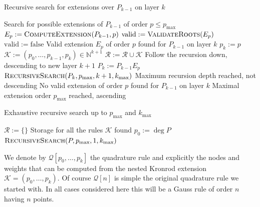 \documentclass[a4paper,10pt]{article}
\begin{document}
\begin{algorithm}
  \caption{Recursive search for extensions over $P_{k-1}$ on layer $k$}
  \label{alg:recursive_search}
  \begin{algorithmic}
    \State {}
    \Comment Search for possible extensions of $P_{k-1}$ of order $p \leq p_{\textrm{max}}$
      \State $E_p := \textsc{ComputeExtension}(P_{k-1}, p)$
        \State $\mathrm{valid} := \textsc{ValidateRoots}(E_p)$
      \Else
        \State $\mathrm{valid} := \mathrm{false}$
      \EndIf
        \State {}
        \Comment Valid extension $E_p$ of order $p$ found for $P_{k-1}$ on layer $k$
        \State $p_k := p$
        \State $\mathcal{K} := (p_0, \ldots, p_{k-1}, p_k) \in \mathbb{N}^{k+1}$
        \State $\mathcal{R} := \mathcal{R} \cup \mathcal{K}$
          \State {}
          \Comment Follow the recursion down, descending to new layer $k+1$
          \State $P_{k} := P_{k-1} E_p$
          \State $\textsc{RecursiveSearch}(P_{k}, p_{\textrm{max}}, k+1, k_{\textrm{max}})$
        \Else
          \State {}
          \Comment Maximum recursion depth reached, not descending
        \EndIf
      \Else
        \State {}
        \Comment No valid extension of order $p$ found for $P_{k-1}$ on layer $k$
      \EndIf
    \EndFor
    \State {}
    \Comment Maximal extension order $p_{\textrm{max}}$ reached, ascending
    \EndProcedure
  \end{algorithmic}
\end{algorithm}

\begin{algorithm}
  \caption{Exhaustive recursive search up to $p_{\textrm{max}}$ and $k_{\textrm{max}}$}
  \label{alg:exhaustive_recursive_search}
  \begin{algorithmic}
      \State $\mathcal{R} := \{\}$
      \Comment Storage for all the rules $\mathcal{K}$ found
      \State $p_0 := \deg P$
      \State $\textsc{RecursiveSearch}(P, p_{\textrm{max}}, 1, k_{\textrm{max}})$
    \EndProcedure
  \end{algorithmic}
\end{algorithm}

We denote by $\mathcal{Q}[p_0, \ldots, p_k]$ the quadrature rule and explicitly
the nodes and weights that can be computed from the nested Kronrod extension
$\mathcal{K} = (p_0, \ldots, p_k)$. Of course $\mathcal{Q}[n]$ is simple the
original quadrature rule we started with. In all cases considered here this
will be a Gauss rule of order $n$ having $n$ points.
\end{document}
